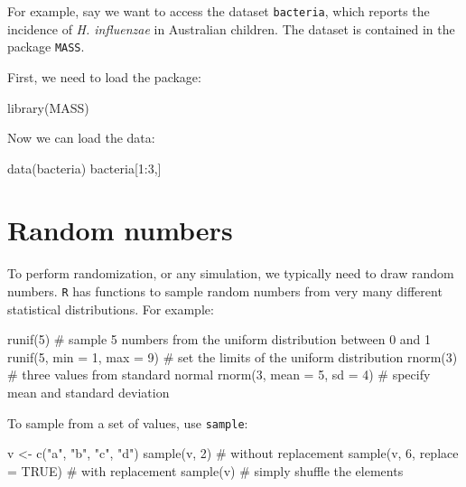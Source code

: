 \documentclass[
  letterpaper,
  DIV=11,
  numbers=noendperiod]{scrreprt}
\newenvironment{Shaded}{\begin{snugshade}}{\end{snugshade}}
\newcommand{\NormalTok}[1]{\textcolor[rgb]{0.00,0.23,0.31}{#1}}
\begin{document}
For example, say we want to access the dataset \texttt{bacteria}, which
reports the incidence of \emph{H. influenzae} in Australian children.
The dataset is contained in the package \texttt{MASS}.

First, we need to load the package:

\begin{Shaded}
\begin{Highlighting}[]
\NormalTok{library(MASS)}
\end{Highlighting}
\end{Shaded}

Now we can load the data:

\begin{Shaded}
\begin{Highlighting}[]
\NormalTok{data(bacteria)}
\NormalTok{bacteria[1:3,]}
\end{Highlighting}
\end{Shaded}

\section*{Random numbers}\label{random-numbers}


To perform randomization, or any simulation, we typically need to draw
random numbers. \texttt{R} has functions to sample random numbers from
very many different statistical distributions. For example:

\begin{Shaded}
\begin{Highlighting}[]
\NormalTok{runif(5) \# sample 5 numbers from the uniform distribution between 0 and 1}
\NormalTok{runif(5, min = 1, max = 9) \# set the limits of the uniform distribution}
\NormalTok{rnorm(3) \# three values from standard normal}
\NormalTok{rnorm(3, mean = 5, sd = 4) \# specify mean and standard deviation}
\end{Highlighting}
\end{Shaded}

To sample from a set of values, use \texttt{sample}:

\begin{Shaded}
\begin{Highlighting}[]
\NormalTok{v \textless{}{-} c("a", "b", "c", "d")}
\NormalTok{sample(v, 2) \# without replacement}
\NormalTok{sample(v, 6, replace = TRUE) \# with replacement}
\NormalTok{sample(v) \# simply shuffle the elements}
\end{Highlighting}
\end{Shaded}
\end{document}
